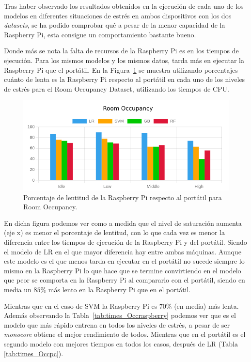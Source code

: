 \documentclass[a4paper, 12pt]{book}
\begin{document}
Tras haber observado los resultados obtenidos en la ejecución de cada uno de los modelos en diferentes situaciones de estrés en ambos dispositivos con los dos \textit{datasets}, se ha podido comprobar qué a pesar de la menor capacidad de la Raspberry Pi, esta consigue un comportamiento bastante bueno.

Donde más se nota la falta de recursos de la Raspberry Pi es en los tiempos de ejecución. Para los mismos modelos y los mismos datos, tarda más en ejecutar la Raspberry Pi que el portátil. En la Figura~\ref{fig:per_occupancy} se muestra utilizando porcentajes cuánto de lenta es la Raspberry Pi respecto al portátil en cada uno de los niveles de estrés para el Room Occupancy Dataset, utilizando los tiempos de CPU.

\begin{figure}[htb]
  \centering
  \includegraphics[width=14cm, keepaspectratio]{img/per_occupancy.png}
  \caption{Porcentaje de lentitud de la Raspberry Pi respecto al portátil para Room Occupancy.}
  \label{fig:per_occupancy}
\end{figure}

En dicha figura podemos ver como a medida que el nivel de saturación aumenta (eje x) es menor el porcentaje de lentitud, con lo que cada vez es menor la diferencia entre los tiempos de ejecución de la Raspberry Pi y del portátil. Siendo el modelo de LR en el que mayor diferencia hay entre ambas máquinas. Aunque este modelo es el que menos tarda en ejecutar en el portátil no sucede siempre lo mismo en la Raspberry Pi lo que hace que se termine convirtiendo en el modelo que peor se comporta en la Raspberry Pi al compararlo con el portátil, siendo en media un $85\%$ más lento en la Raspberry Pi que en el portátil.

Mientras que en el caso de SVM la Raspberry Pi es $70\%$ (en media) más lenta. Además observando la Tabla~\ref{tab:times_Occraspberry} podemos ver que es el modelo que más rápido entrena en todos los niveles de estrés, a pesar de ser \textit{monocore} obtiene el mejor rendimiento de todos. Mientras que en el portátil es el segundo modelo con mejores tiempos en todos los casos, después de LR (Tabla \ref{tab:times_Occpc}).
\end{document}
